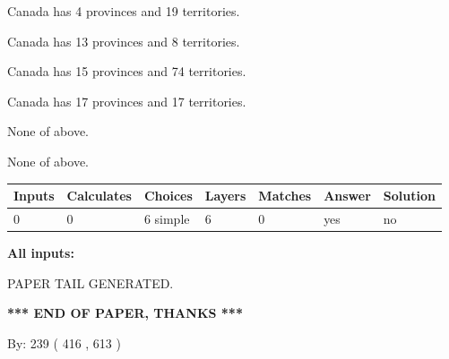 \documentclass[12pt]{article}
\begin{document}
 
Canada has   4 provinces and  19 territories.
 
 
Canada has  13 provinces and  8 territories.
 
 
Canada has  15 provinces and  74 territories.
 
 
Canada has  17 provinces and  17 territories.
 
 
 None of above.
 
 
\noindent{}
 
 
 None of above.
 
 
\noindent{}
 
 
   
   
   
   
\noindent\begin{tabular}{|l|l|l|l|l|l|l|}
 \hline
Inputs & Calculates & Choices & Layers & Matches & Answer & Solution \\ \hline
 0  & 
 0  & 
 6
  simple  
  & 
 6  & 
 0  & 
  yes & 
  no 
  \\ \hline
 \end{tabular}
   
   
   
   
\noindent{}
   
   
   
   
\noindent\vspace{0.1in}\hspace{-0.08in} {\textbf{\Large{All inputs: }}}
   
   
   
   
   
   
 \vspace{0.2in}
 
   
   
\vspace{2.0in} PAPER TAIL GENERATED.
   
   
   
   
\vspace{1.0in} 
{\textbf{\large{ *** END OF PAPER, THANKS *** }}} 
   
   
\hspace{1.0in} By: 
 239 ( 416 ,  613 )
   
\end{document}
